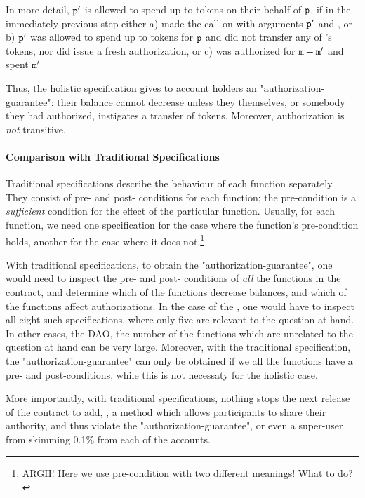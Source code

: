 In more detail, ${\mbox{\tt{p}}}'$ is allowed to spend 
up to  tokens on their behalf of ${\mbox{\tt{p}}}$, if in the immediately previous step either a)
  made the call  on  
with arguments ${\mbox{\tt{p}}}'$ and , or b)  
${\mbox{\tt{p}}}'$ was allowed to spend  up to  tokens for ${\mbox{\tt{p}}}$
and did not transfer any of 's tokens, nor did  issue a fresh authorization,
or c)  was authorized for ${\mbox{\tt{m}}}+{\mbox{\tt{m}}}'$ and spent ${\mbox{\tt{m}}}'$ 
  
 

 Thus, the holistic specification  gives  to  account holders an "authorization-guarantee": their balance cannot decrease unless they themselves,  or somebody they had  authorized, instigates a transfer of tokens. Moreover, authorization is {\em not} transitive.
 
\paragraph{Comparison with Traditional Specifications}
 
 Traditional  specifications %
 describe the behaviour of each function separately.
 They  consist of pre- and post- conditions for each function; the pre-condition is 
 a {\em sufficient} condition for the effect of the particular function.
 Usually, for each function, we need one specification for the case 
 where the function's pre-condition holds, another for the case where it does not.\footnote{ARGH! 
 Here we use pre-condition with two different meanings! What to do?}
  
With traditional  specifications, to obtain the "authorization-guarantee", 
one would need to inspect the pre- and post- conditions of {\em all} the functions
in the contract, and determine which of the functions decrease balances, and which of the functions 
 affect authorizations.
 In the case of the , one would have to inspect all eight such specifications, 
 where only five are relevant to the question at hand.
 In other cases, \eg the DAO, the number of the functions which are unrelated
 to the question at hand can be very large.
 Moreover, with the traditional specification, the "authorization-guarantee" can only be 
 obtained if we all the functions have a pre- and post-conditions, while this is not necessaty for the
 holistic case.
 
More importantly, with traditional  specifications, nothing stops the next release of the contract to add, 
\eg, a method which allows participants to share their authority, and thus
violate the "authorization-guarantee", or even a super-user from skimming 0.1\% from each of the accounts.

